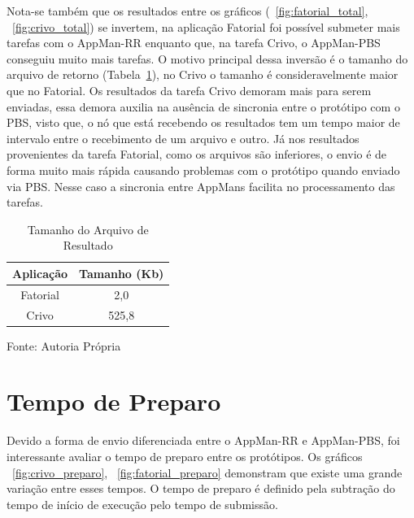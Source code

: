 Nota-se também que os resultados entre os gráficos (~\ref{fig:fatorial_total}, ~\ref{fig:crivo_total}) se invertem, na aplicação Fatorial foi possível submeter mais tarefas com o AppMan-RR enquanto que, na tarefa Crivo, o AppMan-PBS conseguiu muito mais tarefas. O motivo principal dessa inversão é o tamanho do arquivo de retorno (Tabela~\ref{tab:tam_arquivo}), no Crivo o tamanho é consideravelmente maior que no Fatorial. Os resultados da tarefa Crivo demoram mais para serem enviadas, essa demora auxilia na ausência de sincronia entre o protótipo com o PBS, visto que, o nó que está recebendo os resultados tem um tempo maior de intervalo entre o recebimento de um arquivo e outro. 
Já nos resultados provenientes da tarefa Fatorial, como os arquivos são inferiores, o envio é de forma muito mais rápida causando problemas com o protótipo quando enviado via PBS. Nesse caso a sincronia entre AppMans facilita no processamento das tarefas.

\begin{table}[hbtp]
\begin{center}
\caption{Tamanho do Arquivo de Resultado}
\label{tab:tam_arquivo}
\begin{tabular}{c|c}
	\hline
		{\bf Aplicação } & {\bf Tamanho (Kb) }\\
	\hline
	Fatorial & 2,0\\ \hline
	Crivo & 525,8\\ \hline
\end{tabular}
\end{center}
\begin{center}
Fonte: Autoria Própria
\end{center}
\end{table}

\section{Tempo de Preparo}

Devido a forma de envio diferenciada entre o AppMan-RR e AppMan-PBS, foi interessante avaliar o tempo de preparo entre os protótipos. Os gráficos ~\ref{fig:crivo_preparo}, ~\ref{fig:fatorial_preparo} demonstram que existe uma grande variação entre esses tempos. O tempo de preparo é definido pela subtração do tempo de início de execução pelo tempo de submissão.

